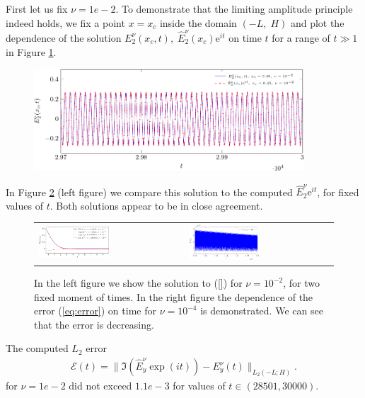 \documentclass[a4paper,10pt]{article}
\begin{document}
First let us fix $\nu=1e-2$. 
To demonstrate that the limiting amplitude principle indeed holds, we fix a point $x=x_c$ 
inside the domain $(-L,\; H)$ and plot the dependence of the solution $E_{2}^{\nu}(x_c,t), \; \hat{E}_2^{\nu}(x_c)\mathrm{e}^{it}$ 
on time $t$ for a range of $t\gg 1$ in Figure \ref{fig:nu1e2_harmon}.  

\begin{figure}[htb]
\includegraphics[width=0.9\textwidth]{figure_nu1e2-crop.pdf}
 \label{fig:nu1e2_harmon}
\end{figure}

In Figure \ref{fig:nu1e2_harmon2} (left figure) we compare this solution to the computed $\hat{E}_2^{\nu}\mathrm{e}^{it}$, for
fixed values of $t$. Both solutions appear to be in close agreement. 
\begin{figure}[htb]
 \begin{tabular}{ll}
\includegraphics[width=0.5\textwidth]{figure_nu1e2_2-crop.pdf}
&
\includegraphics[width=0.5\textwidth]{figure_error_nu1e4-crop.pdf}\\
\end{tabular}
\caption{In the left figure we show the solution to (\ref{}) for $\nu=10^{-2}$, for two fixed moment of times. In the right figure 
the dependence of the error (\ref{eq:error}) on time for $\nu=10^{-4}$ is demonstrated. 
We can see that the error is decreasing.}
 \label{fig:nu1e2_harmon2}
\end{figure}
The computed $L_2$ error
\begin{align}
\label{eq:error}
\mathcal{E}(t)=\|\Im\left(\hat{E}_y^{\nu}\exp(it)\right)-E_y^{\nu}(t)\|_{L_{2}(-L;H)}.
\end{align}
for $\nu=1e-2$ did not exceed $1.1e-3$ for values of $t\in \left(28501,  30000\right)$. 
\end{document}
